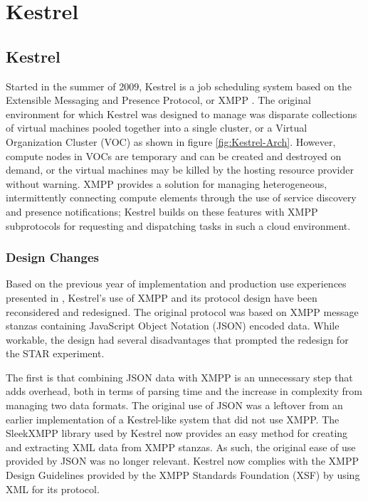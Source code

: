 \chapter{Kestrel}
\section{Kestrel}

\label{sec:Kestrel} Started in the summer of 2009, Kestrel is a job
scheduling system based on the Extensible Messaging and Presence Protocol,
or XMPP \cite{Saint-Andre2004}\cite{Saint-Andre2004a}. The original
environment for which Kestrel was designed to manage was disparate
collections of virtual machines pooled together into a single cluster,
or a Virtual Organization Cluster (VOC) \cite{Murphy2009} as shown
in figure \ref{fig:Kestrel-Arch}. However, compute nodes in VOCs
are temporary and can be created and destroyed on demand, or the virtual
machines may be killed by the hosting resource provider without warning.
XMPP provides a solution for managing heterogeneous, intermittently
connecting compute elements through the use of service discovery and
presence notifications; Kestrel builds on these features with XMPP
subprotocols for requesting and dispatching tasks in such a cloud
environment.


\subsection{Design Changes}

\label{sec:Kestrel:Changes} Based on the previous year of implementation
and production use experiences presented in \cite{Stout10}, Kestrel's
use of XMPP and its protocol design have been reconsidered and redesigned.
The original protocol was based on XMPP message stanzas containing
JavaScript Object Notation (JSON) \cite{Crockford} encoded data.
While workable, the design had several disadvantages that prompted
the redesign for the STAR experiment.

The first is that combining JSON data with XMPP is an unnecessary
step that adds overhead, both in terms of parsing time and the increase
in complexity from managing two data formats. The original use of
JSON was a leftover from an earlier implementation of a Kestrel-like
system that did not use XMPP. The SleekXMPP library \cite{SleekXMPP}
used by Kestrel now provides an easy method for creating and extracting
XML data from XMPP stanzas. As such, the original ease of use provided
by JSON was no longer relevant. Kestrel now complies with the XMPP
Design Guidelines \cite{XEP-0134} provided by the XMPP Standards
Foundation (XSF) \cite{XSF} by using XML for its protocol.

